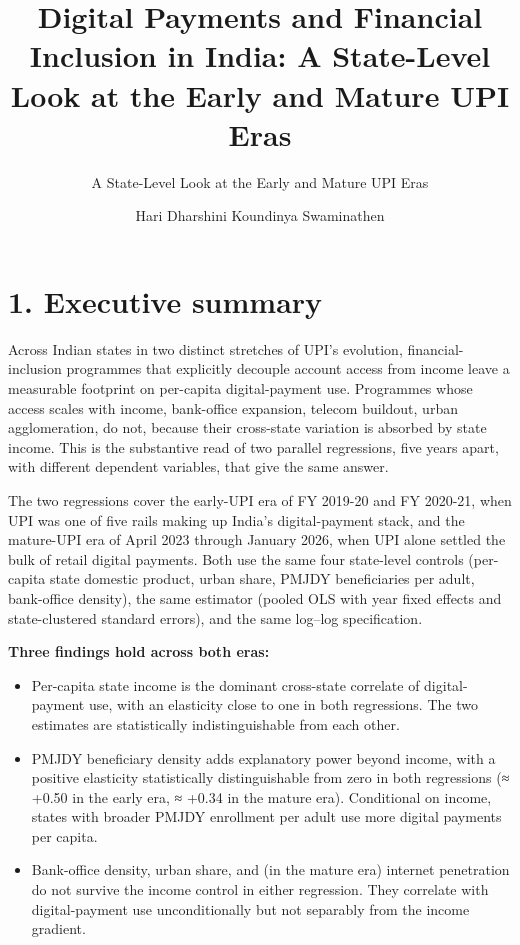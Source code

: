 \documentclass[
]{article}
\title{Digital Payments and Financial Inclusion in India: A State-Level
Look at the Early and Mature UPI Eras}
\subtitle{A State-Level Look at the Early and Mature UPI Eras}
\author{Hari Dharshini Koundinya Swaminathen}
\date{}
\begin{document}
\maketitle

\section{1. Executive summary}\label{executive-summary}

Across Indian states in two distinct stretches of UPI's evolution,
financial-inclusion programmes that explicitly decouple account access
from income leave a measurable footprint on per-capita digital-payment
use. Programmes whose access scales with income, bank-office expansion,
telecom buildout, urban agglomeration, do not, because their cross-state
variation is absorbed by state income. This is the substantive read of
two parallel regressions, five years apart, with different dependent
variables, that give the same answer.

The two regressions cover the early-UPI era of FY 2019-20 and FY
2020-21, when UPI was one of five rails making up India's
digital-payment stack, and the mature-UPI era of April 2023 through
January 2026, when UPI alone settled the bulk of retail digital
payments. Both use the same four state-level controls (per-capita state
domestic product, urban share, PMJDY beneficiaries per adult,
bank-office density), the same estimator (pooled OLS with year fixed
effects and state-clustered standard errors), and the same log--log
specification.

\textbf{Three findings hold across both eras:}

\begin{itemize}
\item
  Per-capita state income is the dominant cross-state correlate of
  digital-payment use, with an elasticity close to one in both
  regressions. The two estimates are statistically indistinguishable
  from each other.
\item
  PMJDY beneficiary density adds explanatory power beyond income, with a
  positive elasticity statistically distinguishable from zero in both
  regressions (≈ +0.50 in the early era, ≈ +0.34 in the mature era).
  Conditional on income, states with broader PMJDY enrollment per adult
  use more digital payments per capita.
\item
  Bank-office density, urban share, and (in the mature era) internet
  penetration do not survive the income control in either regression.
  They correlate with digital-payment use unconditionally but not
  separably from the income gradient.
\end{itemize}
\end{document}

